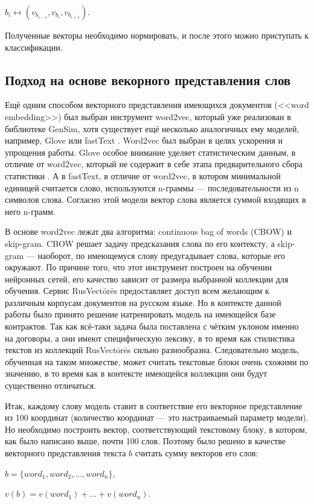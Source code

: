 \documentclass[12pt]{article}
\begin{document}
\begin{center}
	$b_i \leftrightarrow (v_{b_{i-1}}, v_{b_i}, v_{b_{i+1}})$.
\end{center}

Полученные векторы необходимо нормировать, и после этого можно приступать к классификации.

\subsection{Подход на основе векорного представления слов}

Ещё одним способом векторного представления имеющихся документов (<<word embedding>>) был выбран инструмент word2vec, который уже реализован в библиотеке GenSim, хотя существует ещё несколько аналогичных ему моделей, например, Glove \cite{glove} или fastText \cite{fasttext}. Word2vec был выбран в целях ускорения и упрощения работы. Glove особое внимание уделяет статистическим данным, в отличие от word2vec, который не содержит в себе этапа предварительного сбора статистики \cite{zakirov, predict}. А в fastText, в отличие от word2vec, в котором минимальной единицей считается слово, используются n-граммы — последовательности из n символов слова. Согласно этой модели вектор слова является суммой входящих в него n-грамм.

В основе word2vec лежат два алгоритма: continuous bag of words (CBOW) и skip-gram. CBOW решает задачу предсказания слова по \linebreak его контексту, а skip-gram --- наоборот, по имеющемуся слову предугадывает слова, которые его окружают. По причине того, что этот \linebreak инструмент построен на обучении нейронных сетей, его качество \linebreak зависит от размера выбранной коллекции для обучения. Сервис \linebreak RusVectōrēs предоставляет доступ всем желающим к различным корпусам документов на русском языке. Но в контексте данной работы было принято решение натренировать модель на имеющейся базе контрактов. Так как всё-таки задача была поставлена с чётким уклоном именно на договоры, а они имеют специфическую лексику, в то время как стилистика текстов из коллекций RusVectōrēs сильно разнообразна. Следовательно модель, обученная на таком множестве, может считать текстовые блоки очень схожими по значению, в то время как в контексте имеющейся коллекции они будут существенно отличаться.  

Итак, каждому слову модель ставит в соответствие его векторное представление из 100 координат (количество координат --- это настраиваемый параметр модели). Но необходимо построить вектор, соответствующий текстовому блоку, в котором, как было написано выше, почти 100 слов. Поэтому было решено в качестве векторного представления текста $b$ считать сумму векторов его слов:
\begin{center}
$b = \{word_1, word_2, …, word_n\}$,

$v(b) = v(word_1) +\ldots + v(word_n)$.
\end{center}
\end{document}
